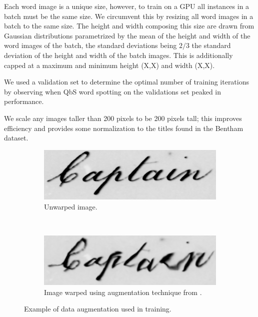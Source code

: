 \documentclass[ms,electronic,twosidetoc,letterpaper,chaptercenter,parttop,lol,lof,lot]{byumsphd}
\begin{document}
Each word image is a unique size, however, to train on a GPU all instances in a batch must be the same size. We circumvent this by resizing all word images in a batch to the same size. The height and width composing this size are drawn from Gaussian distributions parametrized by the mean of the height and width of
the word images of the batch, the standard deviations being $2/3$ the standard deviation of the height and width of the batch images. This is additionally capped at a maximum and minimum height (X,X) and width (X,X).

We used a validation set to determine the optimal number of training iterations by observing when QbS word spotting on the validations set peaked in performance.

We scale any images taller than 200 pixels to be 200 pixels tall; this improves efficiency and provides some normalization to the titles found in the Bentham dataset.

\begin{figure}
    \centering
    \begin{subfigure}[t]{0.46\textwidth}
    		\centering
    		\includegraphics[width=\textwidth]{Captain_unwarped}
    		\caption{Unwarped image.}
    	\end{subfigure}
    	~
    	\begin{subfigure}[t]{0.46\textwidth}
    		\centering
    		\includegraphics[width=\textwidth]{Captain_warped}
    		\caption{Image warped using augmentation technique from \cite{wigington2017}.}
    	\end{subfigure}
    	\caption{Example of data augmentation used in training.}
    	\label{fig:augmentation}
\end{figure}
\end{document}
